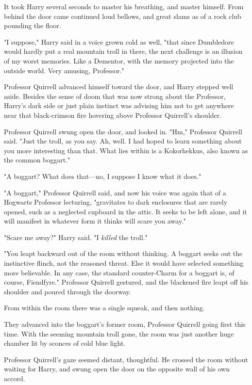 It took Harry several seconds to master his breathing, and master himself. From
behind the door came continued loud bellows, and great slams as of a rock club
pounding the floor.

"I suppose," Harry said in a voice grown cold as well, "that since Dumbledore
would hardly put a real mountain troll in there, the next challenge is an
illusion of my worst memories. Like a Dementor, with the memory projected into
the outside world. Very amusing, Professor."

Professor Quirrell advanced himself toward the door, and Harry stepped well
aside. Besides the sense of doom that was now strong about the Professor,
Harry's dark side or just plain instinct was advising him not to get anywhere
near that black-crimson fire hovering above Professor Quirrell's shoulder.

Professor Quirrell swung open the door, and looked in. "Hm," Professor Quirrell
said. "Just the troll, as you say. Ah, well. I had hoped to learn something
about you more interesting than that. What lies within is a Kokorhekkus,
also known as the common boggart."

"A boggart? What does that---no, I suppose I know what it does."

"A boggart," Professor Quirrell said, and now his voice was again that of a
Hogwarts Professor lecturing, "gravitates to dark enclosures that are rarely
opened, such as a neglected cupboard in the attic. It seeks to be left alone,
and it will manifest in whatever form it thinks will scare you away."

"Scare me away?" Harry said. "I \emph{killed} the troll."

"You leapt backward out of the room without thinking. A boggart seeks out the
instinctive flinch, not the reasoned threat. Else it would have selected
something more believable. In any case, the standard counter-Charm for a
boggart is, of course, Fiendfyre." Professor Quirrell gestured, and the
blackened fire leapt off his shoulder and poured through the doorway.

From within the room there was a single squeak, and then nothing.

They advanced into the boggart's former room, Professor Quirrell going first
this time. With the seeming mountain troll gone, the room was just another huge
chamber lit by sconces of cold blue light.

Professor Quirrell's gaze seemed distant, thoughtful. He crossed the room
without waiting for Harry, and swung open the door on the opposite wall of his
own accord.

